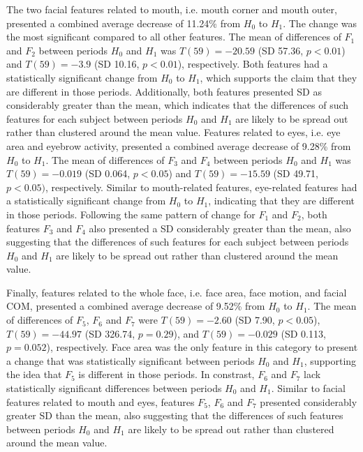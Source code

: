 The two facial features related to mouth, i.e. mouth corner and mouth outer, presented a combined average decrease of 11.24\% from $H_0$ to $H_1$. The change was the most significant compared to all other features. The mean of differences of $F_1$ and $F_2$ between periods $H_0$ and $H_1$ was $T(59) = -20.59$ (SD 57.36, $p < 0.01$) and $T(59) = -3.9$ (SD 10.16, $p < 0.01$), respectively. Both features had a statistically significant change from $H_0$ to $H_1$, which supports the claim that they are different in those periods. Additionally, both features presented SD as considerably greater than the mean, which indicates that the differences of such features for each subject between periods $H_0$ and $H_1$ are likely to be spread out rather than clustered around the mean value.
Features related to eyes, i.e. eye area and eyebrow activity, presented a combined average decrease of 9.28\% from $H_0$ to $H_1$. The mean of differences of $F_3$ and $F_4$ between periods $H_0$ and $H_1$ was $T(59) = -0.019$ (SD 0.064, $p < 0.05$) and $T(59) = -15.59$ (SD 49.71, $p < 0.05)$, respectively. Similar to mouth-related features, eye-related features had a statistically significant change from $H_0$ to $H_1$, indicating that they are different in those periods. Following the same pattern of change for $F_1$ and $F_2$, both features $F_3$ and $F_4$ also presented a SD considerably greater than the mean, also suggesting that the differences of such features for each subject between periods $H_0$ and $H_1$ are likely to be spread out rather than clustered around the mean value.

Finally, features related to the whole face, i.e. face area, face motion, and facial COM, presented a combined average decrease of 9.52\% from $H_0$ to $H_1$. The mean of differences of $F_5$, $F_6$ and $F_7$ were $T(59) = -2.60$ (SD 7.90, $p < 0.05$), $T(59) = -44.97$ (SD 326.74, $p = 0.29$), and $T(59) = -0.029$ (SD 0.113, $p = 0.052$), respectively. Face area was the only feature in this category to present a change that was statistically significant between periods $H_0$ and $H_1$, supporting the idea that $F_5$ is different in those periods. In constrast, $F_6$ and $F_7$ lack statistically significant differences between periods $H_0$ and $H_1$. Similar to facial features related to mouth and eyes, features $F_5$, $F_6$ and $F_7$ presented considerably greater SD than the mean, also suggesting that the differences of such features between periods $H_0$ and $H_1$ are likely to be spread out rather than clustered around the mean value.

